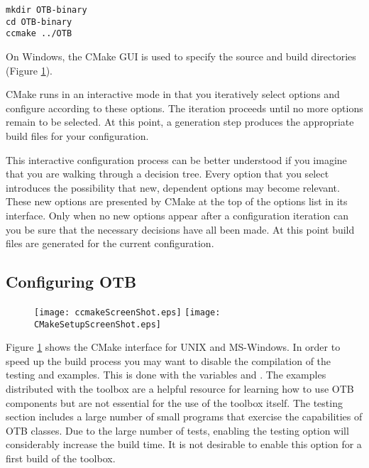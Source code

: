 \small
\begin{verbatim}
mkdir OTB-binary
cd OTB-binary
ccmake ../OTB
\end{verbatim}
\normalsize

On Windows, the CMake GUI is used to specify the source and build
directories (Figure \ref{fig:CMakeGUI}).

CMake runs in an interactive mode in that you iteratively select
options and configure according to these options. The iteration
proceeds until no more options remain to be selected. At this point, a
generation step produces the appropriate build files for your
configuration.

This interactive configuration process can be better understood if you
imagine that you are walking through a decision tree.  Every option that you
select introduces the possibility that new, dependent options may become
relevant. These new options are presented by CMake at the top of the options
list in its interface.  Only when no new options appear after a configuration
iteration can you be sure that the necessary decisions have all been made. At
this point build files are generated for the current configuration.

\subsection{Configuring OTB}
\label{sec:ConfiguringOTBwithVTK}
  

\begin{figure}[ht]
\centering 
\texttt{[image: ccmakeScreenShot.eps]}
\texttt{[image: CMakeSetupScreenShot.eps]}
\label{fig:CMakeGUI}
\end{figure}

Figure \ref{fig:CMakeGUI} shows the CMake interface for UNIX and MS-Windows.
In order to speed up the build process you may want to disable the compilation
of the testing and examples. This is done with the variables
 and .  The examples
distributed with the toolbox are a helpful resource for learning how to use OTB
components but are not essential for the use of the toolbox itself. The testing
section includes a large number of small programs that exercise the
capabilities of OTB classes. Due to the large number of tests, enabling the
testing option will considerably increase the build time.  It is not
desirable to enable this option for a first build of the toolbox.

